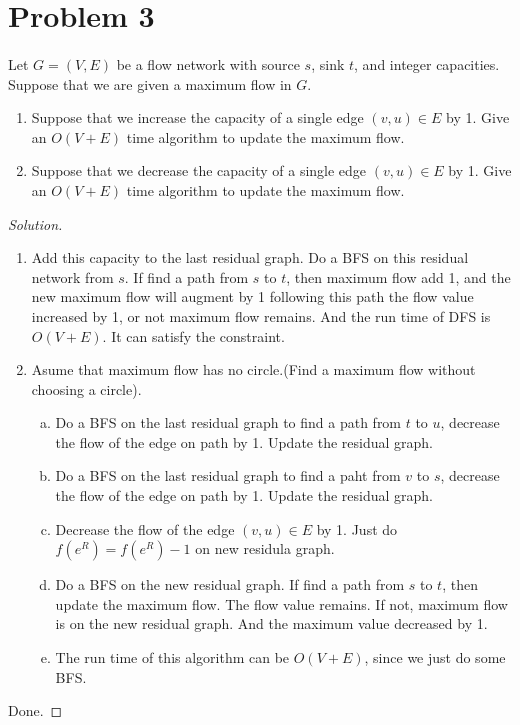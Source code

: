 \documentclass[a4paper]{article}
\newenvironment{solution}
  {\renewcommand\qedsymbol{$\blacksquare$}\begin{proof}[Solution]}
  {\end{proof}}
\begin{document}
\section*{Problem 3 }
\paragraph{}
Let $G = (V, E)$ be a flow network with source $s$, sink $t$, and integer capacities. Suppose that we are
given a maximum flow in $G$.
\begin{enumerate}[1.]
  \item  Suppose that we increase the capacity of a single edge $(v, u) \in E$ by 1. Give an $O(V + E)$ time
  algorithm to update the maximum flow.
  \item  Suppose that we decrease the capacity of a single edge $(v, u) \in E$ by 1. Give an $O(V + E)$ time
  algorithm to update the maximum flow.
\end{enumerate}

\begin{solution}\
  \begin{enumerate}[1.]
    \item Add this capacity to the last residual graph.
    Do a BFS on this residual network from $s$. If find a path from $s$ to $t$, then maximum flow add 1, and the new maximum flow will augment by 1 following this path the flow value increased by 1, or not maximum flow remains. And the run time of DFS is $O(V+E)$. It can satisfy the constraint.
    \item Asume that maximum flow has no circle.(Find a maximum flow without choosing a circle).
    \begin{enumerate}[a.]
      \item Do a BFS on the last residual graph to find a path from $t$ to $u$, decrease the flow of the edge on path by 1. Update the residual graph.
      \item Do a BFS on the last residual graph to find a paht from $v$ to $s$, decrease the flow of the edge on path by 1. Update the residual graph.
      \item Decrease the flow of the edge $(v,u)\in E$ by 1. Just do $f(e^{R})=f(e^{R})-1$ on new residula graph.
      \item Do a BFS on the new residual graph. If find a path from $s$ to $t$, then update the maximum flow. The flow value remains. If not, maximum flow is on the new residual graph. And the maximum value decreased by 1.
      \item The run time of this algorithm can be $O(V+E)$, since we just do some BFS.
    \end{enumerate}
  \end{enumerate}

  Done.
\end{solution}
\end{document}
